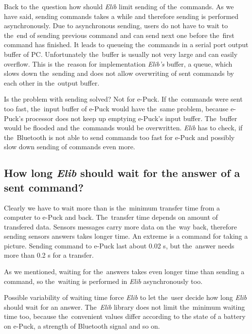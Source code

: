   Back to the~question how should {\it Elib} limit sending of the~commands.
  As we have said, sending commands takes a while and therefore sending is performed asynchronously. 
  Due to asynchronous sending, users do not have to wait to the~end of sending previous command and
  can send next one before the~first command has finished.
  It leads to queueing the~commands in a serial port output buffer of PC. Unfortunately the~buffer is usually not 
  very large and can easily overflow. 
  This is the~reason for implementation {\it Elib's} buffer, a queue, which slows down the~sending and does not allow
  overwriting of sent commands by each other in the~output buffer. 
   
  Is the problem with sending solved? Not for e-Puck. If the~commands were sent too fast,
  the~input buffer of e-Puck would have the~same problem, because e-Puck's processor does not keep up emptying e-Puck's
  input buffer. The~buffer would be flooded and the~commands would be overwritten. 
  {\it Elib} has to check, if the~Bluetooth is not able to send commands too fast for e-Puck
  and possibly slow down sending of commands even more.

  \subsection*{How long {\it Elib} should wait for the answer of a sent command?} 
  Clearly we have to wait more than is the~minimum transfer time from a computer to e-Puck and back.
  The~transfer time depends on  amount of transfered data. 
  Sensors messages carry more data on the~way back, therefore sending sensors answers takes longer time.
  An extreme is a command for taking a picture. Sending command to e-Puck last about 0.02 s, but
  the~answer needs more than 0.2 s for a transfer.
   
  As we mentioned, waiting for the~answers takes even longer time than sending a command,
  so the~waiting is performed in {\it Elib} asynchronously too.
   
  Possible variability of waiting time force {\it Elib} to let the~user decide how long
   {\it Elib} should wait for an answer. The~{\it Elib} library does not limit the~minimum waiting time too,
  because the~convenient values differ according to the state of a battery on e-Puck, a strength of Bluetooth signal
  and so on. 
  
